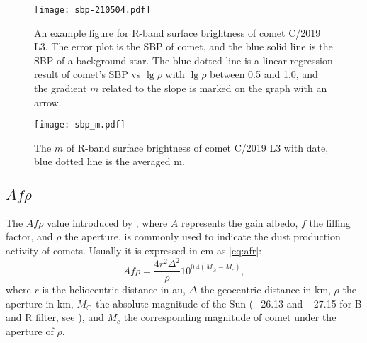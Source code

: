 \begin{figure}[!htbp]
    \centering
    \texttt{[image: sbp-210504.pdf]}
    \caption{An example figure for R-band surface brightness of comet C/2019 L3. The error plot is the SBP of comet, and the blue solid line is the SBP of a background star. The blue dotted line is a linear regression result of comet's SBP vs $\lg{\rho}$ with $\lg{\rho}$ between 0.5 and 1.0, and the gradient $m$ related to the slope is marked on the graph with an arrow. }
    \label{fig:sbp}
\end{figure}

\begin{figure}[!htbp]
    \centering
    \texttt{[image: sbp\_m.pdf]}
    \caption{The $m$ of R-band surface brightness of comet C/2019 L3 with date, blue dotted line is the averaged m. }
    \label{fig:sbp_m}
\end{figure}


\subsection{$Af\rho$}



The $Af\rho$ value introduced by \citet{ahearn_comet_1984}, where $A$ represents the gain albedo, $f$ the filling factor, and $\rho$ the aperture, is commonly used to indicate the dust production activity of comets. Usually it is expressed in \si{\cm} as \autoref{eq:afr}: 
\begin{equation}
    Af\rho = \frac{4 r^2 \Delta^2}{\rho} 10^{0.4(M_\odot - M_c)}, 
    \label{eq:afr}
\end{equation}
where $r$ is the heliocentric distance in \si{\astronomicalunit}, $\Delta$ the geocentric distance in \si{\km}, $\rho$ the aperture in \si{\km}, $M_\odot$ the absolute magnitude of the Sun (\si{\num{-26.13}} and \si{\num{-27.15}} for B and R filter, see \citealt{willmer_absolute_2018}), and $M_c$ the corresponding magnitude of comet under the aperture of $\rho$. 

